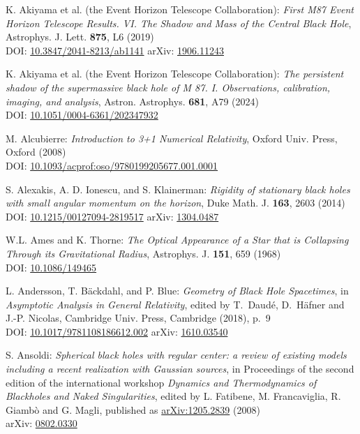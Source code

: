 \begin{thebibliography}{123}
K. Akiyama et al. (the Event Horizon Telescope Collaboration):
{\em First M87 Event Horizon Telescope Results. VI. The Shadow and Mass of the Central Black Hole},
Astrophys. J. Lett. {\bf 875}, L6 (2019)\\
DOI: \href{https://doi.org/10.3847/2041-8213/ab1141}{10.3847/2041-8213/ab1141}\hfill
arXiv: \href{https://arxiv.org/abs/1906.11243}{1906.11243}

K. Akiyama et al. (the Event Horizon Telescope Collaboration):
{\em The persistent shadow of the supermassive black hole of M 87.
I. Observations, calibration, imaging, and analysis},
Astron. Astrophys. {\bf 681}, A79 (2024)\\
DOI: \href{https://doi.org/10.1051/0004-6361/202347932}{10.1051/0004-6361/202347932}

M. Alcubierre:
{\em Introduction to 3+1 Numerical Relativity},
Oxford Univ. Press, Oxford (2008)\\
DOI: \href{https://doi.org/10.1093/acprof:oso/9780199205677.001.0001}{10.1093/acprof:oso/9780199205677.001.0001}

S. Alexakis, A. D. Ionescu, and S. Klainerman: {\em Rigidity of stationary black holes with small angular momentum on the horizon},
Duke Math. J. {\bf 163}, 2603 (2014)\\
DOI: \href{https://doi.org/10.1215/00127094-2819517}{10.1215/00127094-2819517}\hfill
arXiv: \href{https://arxiv.org/abs/1304.0487}{1304.0487}

W.L. Ames and K. Thorne:
{\em The Optical Appearance of a Star that is Collapsing Through its Gravitational Radius},
Astrophys. J. {\bf 151}, 659 (1968)\\
DOI: \href{https://doi.org/10.1086/149465}{10.1086/149465}

L. Andersson, T. Bäckdahl, and P. Blue:
{\em Geometry of Black Hole Spacetimes},
in {\em Asymptotic Analysis in General Relativity}, edited by
T.~Daudé, D.~Häfner and J.-P. Nicolas,
Cambridge Univ. Press, Cambridge (2018), p.~9\\
DOI: \href{https://doi.org/10.1017/9781108186612.002}{10.1017/9781108186612.002}\hfill
arXiv: \href{https://arxiv.org/abs/1610.03540}{1610.03540}

S. Ansoldi:
{\em Spherical black holes with regular center: a review of existing models including a recent realization with Gaussian sources},
in Proceedings of the second edition of the international workshop \emph{Dynamics and Thermodynamics of Blackholes and Naked Singularities}, edited by L. Fatibene, M. Francaviglia, R. Giambò and G. Magli,
published as \href{https://arxiv.org/abs/1205.2839}{arXiv:1205.2839}
(2008)\\
arXiv: \href{https://arxiv.org/abs/0802.0330}{0802.0330}


\end{thebibliography}
